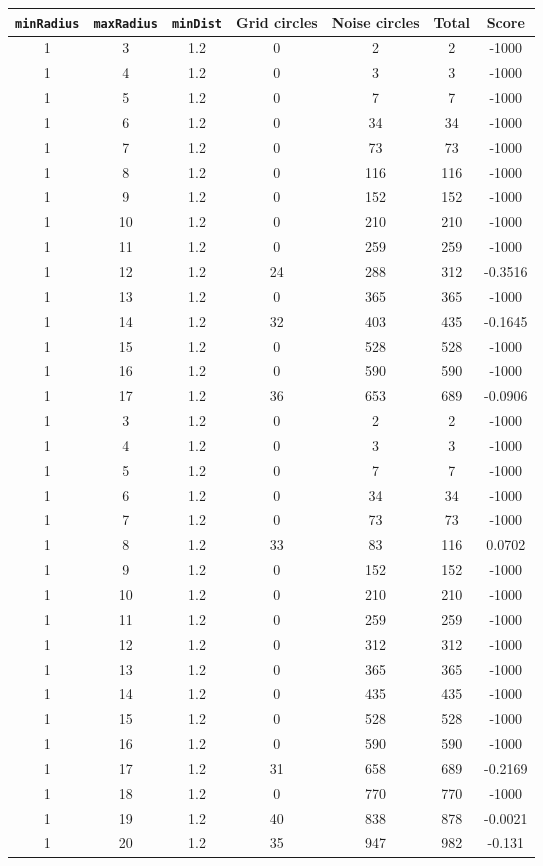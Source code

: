 \documentclass[letterpaper, 12pt]{article}
\begin{document}
\begin{longtable}{|c|c|c|c|c|c|c|}
\hline
\textbf{\texttt{minRadius}} & \textbf{\texttt{maxRadius}} & \textbf{\texttt{minDist}} & \textbf{Grid circles} & \textbf{Noise circles} & \textbf{Total} & \textbf{Score} \\
\hline
1 & 3 & 1.2 & 0 & 2 & 2 & -1000 \\
\hline
1 & 4 & 1.2 & 0 & 3 & 3 & -1000 \\
\hline
1 & 5 & 1.2 & 0 & 7 & 7 & -1000 \\
\hline
1 & 6 & 1.2 & 0 & 34 & 34 & -1000 \\
\hline
1 & 7 & 1.2 & 0 & 73 & 73 & -1000 \\
\hline
1 & 8 & 1.2 & 0 & 116 & 116 & -1000 \\
\hline
1 & 9 & 1.2 & 0 & 152 & 152 & -1000 \\
\hline
1 & 10 & 1.2 & 0 & 210 & 210 & -1000 \\
\hline
1 & 11 & 1.2 & 0 & 259 & 259 & -1000 \\
\hline
1 & 12 & 1.2 & 24 & 288 & 312 & -0.3516 \\
\hline
1 & 13 & 1.2 & 0 & 365 & 365 & -1000 \\
\hline
1 & 14 & 1.2 & 32 & 403 & 435 & -0.1645 \\
\hline
1 & 15 & 1.2 & 0 & 528 & 528 & -1000 \\
\hline
1 & 16 & 1.2 & 0 & 590 & 590 & -1000 \\
\hline
1 & 17 & 1.2 & 36 & 653 & 689 & -0.0906 \\
\hline
1 & 3 & 1.2 & 0 & 2 & 2 & -1000 \\
\hline
1 & 4 & 1.2 & 0 & 3 & 3 & -1000 \\
\hline
1 & 5 & 1.2 & 0 & 7 & 7 & -1000 \\
\hline
1 & 6 & 1.2 & 0 & 34 & 34 & -1000 \\
\hline
1 & 7 & 1.2 & 0 & 73 & 73 & -1000 \\
\hline
1 & 8 & 1.2 & 33 & 83 & 116 & 0.0702 \\
\hline
1 & 9 & 1.2 & 0 & 152 & 152 & -1000 \\
\hline
1 & 10 & 1.2 & 0 & 210 & 210 & -1000 \\
\hline
1 & 11 & 1.2 & 0 & 259 & 259 & -1000 \\
\hline
1 & 12 & 1.2 & 0 & 312 & 312 & -1000 \\
\hline
1 & 13 & 1.2 & 0 & 365 & 365 & -1000 \\
\hline
1 & 14 & 1.2 & 0 & 435 & 435 & -1000 \\
\hline
1 & 15 & 1.2 & 0 & 528 & 528 & -1000 \\
\hline
1 & 16 & 1.2 & 0 & 590 & 590 & -1000 \\
\hline
1 & 17 & 1.2 & 31 & 658 & 689 & -0.2169 \\
\hline
1 & 18 & 1.2 & 0 & 770 & 770 & -1000 \\
\hline
1 & 19 & 1.2 & 40 & 838 & 878 & -0.0021 \\
\hline
1 & 20 & 1.2 & 35 & 947 & 982 & -0.131 \\
\hline
\end{longtable}
\end{document}
